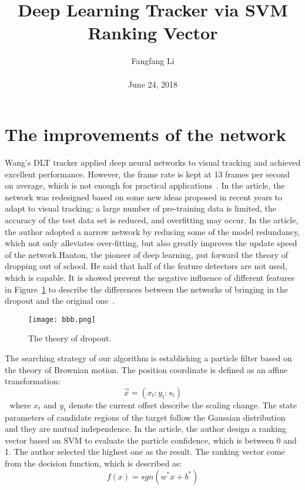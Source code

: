 \documentclass[10pt,twocolumn,letterpaper]{article}
\begin{document}
\title{\textbf{Deep Learning Tracker via SVM Ranking Vector}}
\author{Fangfang Li\\\\June 24, 2018}
\maketitle

\section{The improvements of the network}
Wang's DLT tracker applied deep neural networks to visual tracking and achieved excellent performance. However, the frame rate is kept at 13 frames per second on average, which is not enough for practical applications~\cite {krizhevsky2012imagenet}. In the article, the network was redesigned based on some new ideas proposed in recent years to adapt to visual tracking: a large number of pre-training data is limited, the accuracy of the test data set is reduced, and overfitting may occur. In the article, the author adopted a narrow network by reducing some of the model redundancy, which not only alleviates over-fitting, but also greatly improves the update speed of the network.Hanton, the pioneer of deep learning, put forward the theory of dropping out of school. He said that half of the feature detectors are not used, which is capable. It is showed prevent the  negative influence  of different features
in  Figure~\ref{fig:1} to  describe  the  differences  between the networks of bringing in the dropout and the original
one~\cite{Ahmed2015An}.

\begin{figure}[!htb]
\begin{center}
\texttt{[image: bbb.png]}
\end{center}
\caption{ The theory of dropout.}
\label{fig:1}
\end{figure}
The searching strategy of our algorithm is establishing a particle filter based on the theory of Brownian motion. The position coordinate is defined as an affine transformation:
\begin{equation}
\vec{x}=(x_t:y_t:s_t)
\end{equation} 
where $x_t$ and $y_t$ denote the current offset describe the scaling change. The state parameters of candidate regions of the target follow the Gaussian distribution and they are mutual independence.
In the article, the author design a ranking vector based on SVM to evaluate the particle confidence, which is between 0 and 1. The author selected the highest one as the result. The ranking vector come from the decision function, which is described as:
\begin{equation}
f(x)=sgn(w^*x+b^*)
\end{equation}
\end{document}
